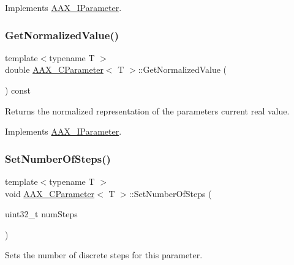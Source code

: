 Implements \mbox{\hyperlink{a01857_ad4b9a53e4e972d1a840ef094036e5a70}{A\+A\+X\+\_\+\+I\+Parameter}}.

\mbox{\label{a01537_a3da77ce2df77961e918418fd2385a50f}} 
\subsubsection{\texorpdfstring{GetNormalizedValue()}{GetNormalizedValue()}}
{\footnotesize\ttfamily template$<$typename T $>$ \\
double \mbox{\hyperlink{a01537}{A\+A\+X\+\_\+\+C\+Parameter}}$<$ T $>$\+::Get\+Normalized\+Value (\begin{DoxyParamCaption}{ }\end{DoxyParamCaption}) const\hspace{0.3cm}{\ttfamily [virtual]}}



Returns the normalized representation of the parameter\textquotesingle{}s current real value. 



Implements \mbox{\hyperlink{a01857_a32bc181c17b36fc52736d4d816c56907}{A\+A\+X\+\_\+\+I\+Parameter}}.

\mbox{\label{a01537_ac1c0ee92affe0379a58411955d27bb2b}} 
\subsubsection{\texorpdfstring{SetNumberOfSteps()}{SetNumberOfSteps()}}
{\footnotesize\ttfamily template$<$typename T $>$ \\
void \mbox{\hyperlink{a01537}{A\+A\+X\+\_\+\+C\+Parameter}}$<$ T $>$\+::Set\+Number\+Of\+Steps (\begin{DoxyParamCaption}\item[{uint32\+\_\+t}]{num\+Steps }\end{DoxyParamCaption})\hspace{0.3cm}{\ttfamily [virtual]}}



Sets the number of discrete steps for this parameter. 


